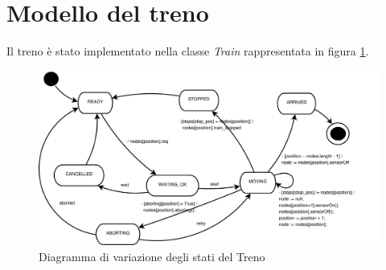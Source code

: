\section{Modello del treno}
Il treno è stato implementato nella classe \textit{Train} rappresentata in
figura \ref{fig:Treno}.
\begin{figure}

\centering
\includegraphics[width=24cm]{imgs/Train.pdf}

\caption{Diagramma di variazione degli stati del Treno}\label{fig:Treno}

\end{figure}

